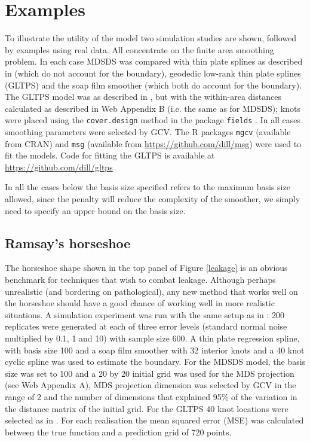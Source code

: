 \documentclass[smallextended]{svjour3}       %
\begin{document}
\section{Examples}
\label{examples}

To illustrate the utility of the model two simulation studies are shown, followed by examples using real data. All concentrate on the finite area smoothing problem. In each case MDSDS was compared with thin plate splines as described in \cite{Wood:2003tc} (which do not account for the boundary), geodedic low-rank thin plate splines (GLTPS) and the soap film smoother (which both do account for the boundary). The GLTPS model was as described in \cite{Wang:2007tf}, but with the within-area distances calculated as described in Web Appendix B (i.e. the same as for MDSDS); knots were placed using the \texttt{cover.design} method in the package \texttt{fields} \citep[again, as in][]{Wang:2007tf}. In all cases smoothing parameters were selected by GCV. The \textsf{R} packages \texttt{mgcv} (available from CRAN) and \texttt{msg} (available from \url{https://github.com/dill/msg}) were used to fit the models. Code for fitting the GLTPS is available at \url{https://github.com/dill/gltps}

In all the cases below the basis size specified refers to the maximum basis size allowed, since the penalty will reduce the complexity of the smoother, we simply need to specify an upper bound on the basis size.


\subsection{Ramsay's horseshoe}

The horseshoe shape shown in the top panel of Figure \ref{leakage} is an obvious benchmark for techniques that wish to combat leakage. Although perhaps unrealistic (and bordering on pathological), any new method that works well on the horseshoe should have a good chance of working well in more realistic situations. A simulation experiment was run with the same setup as in \cite{Wood:2008vo}: 200 replicates were generated at each of three error levels (standard normal noise multiplied by 0.1, 1 and 10) with sample size 600. A thin plate regression spline, with basis size 100 and a soap film smoother with 32 interior knots  and a 40 knot cyclic  spline was used to estimate the boundary. For the MDSDS model, the basis size was set to 100 and a 20 by 20 initial grid was used for the MDS projection (see Web Appendix A), MDS projection dimension was selected by GCV in the range of 2 and the number of dimensions that explained 95\% of the variation in the distance matrix of the initial grid. For the GLTPS 40 knot locations were selected as in \cite{Wang:2007tf}. For each realisation the mean squared error (MSE) was calculated between the true function and a prediction grid of 720 points.
\end{document}

